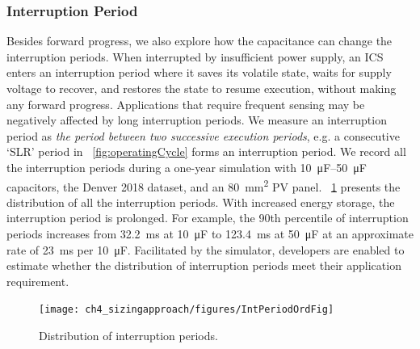 \subsubsection{Interruption Period} \label{subsubsec:intper}
Besides forward progress, we also explore how the capacitance can change the interruption periods. 
When interrupted by insufficient power supply, an ICS enters an interruption period where it saves its volatile state, waits for supply voltage to recover, and restores the state to resume execution, without making any forward progress. Applications that require frequent sensing may be negatively affected by long interruption periods. We measure an interruption period as \textit{the period between two successive execution periods}, e.g. a consecutive `SLR' period in \figurename{~\ref{fig:operatingCycle}} forms an interruption period. 
We record all the interruption periods during a one-year simulation with \SIrange{10}{50}{\micro\farad} capacitors, the Denver 2018 dataset, and an \SI{80}{\square\milli\meter} PV panel. 
\figurename{~\ref{fig:interruption}} presents the distribution of all the interruption periods. 
With increased energy storage, the interruption period is prolonged. For example, the 90th percentile of interruption periods increases from \SI{32.2}{\milli\second} at \SI{10}{\micro\farad} to \SI{123.4}{\milli\second} at \SI{50}{\micro\farad} at an approximate rate of \SI{23}{\milli\second} per \SI{10}{\micro\farad}. 
Facilitated by the simulator, developers are enabled to estimate whether the distribution of interruption periods meet their application requirement. 



\begin{figure}[!t]
    \centering
    \texttt{[image: ch4\_sizingapproach/figures/IntPeriodOrdFig]}
    \caption{Distribution of interruption periods. }
    \label{fig:interruption}
\end{figure}


